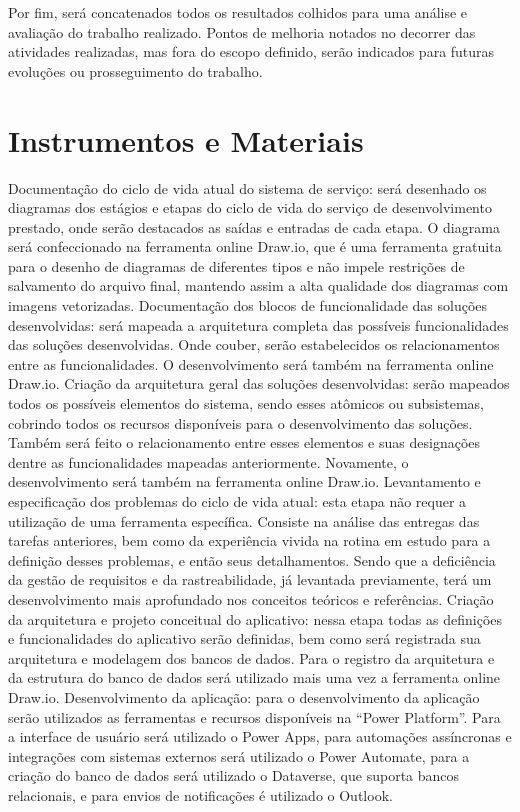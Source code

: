 Por fim, será concatenados todos os resultados colhidos para uma análise e 
avaliação do trabalho realizado. Pontos de melhoria notados no decorrer das 
atividades realizadas, mas fora do escopo definido, serão indicados para futuras 
evoluções ou prosseguimento do trabalho. 

	\section{Instrumentos e Materiais}
	Documentação do ciclo de vida atual do sistema de serviço: será desenhado 
	os diagramas dos estágios e etapas do ciclo de vida do serviço de 
	desenvolvimento prestado, onde serão destacados as saídas e entradas de 
	cada etapa. O diagrama será confeccionado na ferramenta online Draw.io, 
	que é uma ferramenta gratuita para o desenho de diagramas de diferentes 
	tipos e não impele restrições de salvamento do arquivo final, mantendo 
	assim a alta qualidade dos diagramas com imagens vetorizadas. 
	Documentação dos blocos de funcionalidade das soluções desenvolvidas: 
	será mapeada a arquitetura completa das possíveis funcionalidades das 
	soluções desenvolvidas. Onde couber, serão estabelecidos os 
	relacionamentos entre as funcionalidades. O desenvolvimento será também 
	na ferramenta online Draw.io. 
	Criação da arquitetura geral das soluções desenvolvidas: serão mapeados 
	todos os possíveis elementos do sistema, sendo esses atômicos ou 
	subsistemas, cobrindo todos os recursos disponíveis para o 
	desenvolvimento das soluções. Também será feito o relacionamento entre 
	esses elementos e suas designações dentre as funcionalidades mapeadas 
	anteriormente. Novamente, o desenvolvimento será também na ferramenta 
	online Draw.io. 
	Levantamento e especificação dos problemas do ciclo de vida atual: esta 
	etapa não requer a utilização de uma ferramenta específica. Consiste na 
	análise das entregas das tarefas anteriores, bem como da experiência vivida 
	na rotina em estudo para a definição desses problemas, e então seus 
	detalhamentos. Sendo que a deficiência da gestão de requisitos e da 
	rastreabilidade, já levantada previamente, terá um desenvolvimento mais 
	aprofundado nos conceitos teóricos e referências. 
	Criação da arquitetura e projeto conceitual do aplicativo: nessa etapa todas 
	as definições e funcionalidades do aplicativo serão definidas, bem como será 
	registrada sua arquitetura e modelagem dos bancos de dados. Para o 
	registro da arquitetura e da estrutura do banco de dados será utilizado mais 
	uma vez a ferramenta online Draw.io. 
	Desenvolvimento da aplicação: para o desenvolvimento da aplicação serão 
	utilizados as ferramentas e recursos disponíveis na “Power Platform”. Para 
	a interface de usuário será utilizado o Power Apps, para automações 
	assíncronas e integrações com sistemas externos será utilizado o Power 
	Automate, para a criação do banco de dados será utilizado o Dataverse, que 
	suporta bancos relacionais, e para envios de notificações é utilizado o 
	Outlook. 

